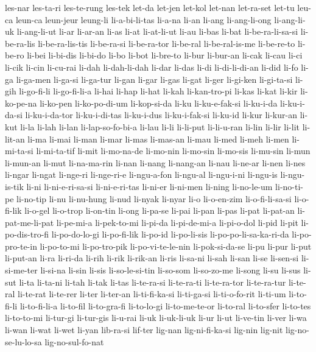 {les-nar les-ta-ri les-te-rung les-tek let-da let-jen let-kol let-nan
let-ra-set let-tu leu-ca leun-ca leun-jeur leung-li li-a-bi-li-tas li-a-na
li-an li-ang li-ang-li-ong li-ang-li-uk li-ang-li-ut li-ar li-ar-an li-as
li-at li-at-li-ut li-au li-bas li-bat li-be-ra-li-sa-si li-be-ra-lis
li-be-ra-lis-tis li-be-ra-si li-be-ra-tor li-be-ral li-be-ral-is-me
li-be-re-to li-be-ro li-bei li-bi-dis li-bi-do li-bo li-bot li-bre-to
li-bur li-bur-an li-cak li-cau li-ci li-cik li-cin li-cu-rai li-dah
li-dah-li-dah li-dar li-das li-di li-di-li-di-an li-did li-fo li-ga
li-ga-men li-ga-si li-ga-tur li-gan li-gar li-gas li-gat li-ger li-gi-ken
li-gi-ta-si li-gih li-go-fi-li li-go-fi-li-a li-hai li-hap li-hat li-kah
li-kan-tro-pi li-kas li-kat li-kir li-ko-pe-na li-ko-pen li-ko-po-di-um
li-kop-si-da li-ku li-ku-e-fak-si li-ku-i-da li-ku-i-da-si li-ku-i-da-tor
li-ku-i-di-tas li-ku-i-dus li-ku-i-fak-si li-ku-id li-kur li-kur-an li-kut
li-la li-lah li-lan li-lap-so-fo-bi-a li-lau li-li li-li-put li-li-u-ran
li-lin li-lir li-lit li-lit-an li-ma li-mai li-man li-mar li-mas li-mas-an
li-mau li-med li-meh li-men li-mi-ta-si li-mi-ta-tif li-mit li-mo-na-de
li-mo-nin li-mo-sin li-mo-sis li-mu-sin li-mun li-mun-an li-mut
li-na-ma-rin li-nan li-nang li-nang-an li-nau li-ne-ar li-nen li-nes
li-ngar li-ngat li-nge-ri li-nge-ri-e li-ngu-a-fon li-ngu-al li-ngu-i-ni
li-ngu-is li-ngu-is-tik li-ni li-ni-e-ri-sa-si li-ni-e-ri-tas li-ni-er
li-ni-men li-ning li-no-le-um li-no-ti-pe li-no-tip li-nu li-nu-hung
li-nud li-nyak li-nyar li-o li-o-en-zim li-o-fi-li-sa-si li-o-fi-lik
li-o-gel li-o-trop li-on-tin li-ong li-pa-se li-pai li-pan li-pas li-pat
li-pat-an li-pat-me-li-pat li-pe-mi-a li-pek-to-mi li-pi-da li-pi-de-mi-a
li-pi-o-dol li-pid li-pit li-po-dis-tro-fi li-po-do-lo-gi li-po-fi-lik
li-po-id li-po-li-sis li-po-po-li-sa-ka-ri-da li-po-pro-te-in li-po-to-mi
li-po-tro-pik li-po-vi-te-le-nin li-pok-si-da-se li-pu li-pur li-put
li-put-an li-ra li-ri-da li-rih li-rik li-rik-an li-ris li-sa-ni li-sah
li-san li-se li-sen-si li-si-me-ter li-si-na li-sin li-sis li-so-le-si-tin
li-so-som li-so-zo-me li-song li-su li-sus li-sut li-ta li-ta-ni li-tah
li-tak li-tas li-te-ra-si li-te-ra-ti li-te-ra-tor li-te-ra-tur li-te-ral
li-te-rat li-te-rer li-ter li-ter-an li-ti-fi-ka-si li-ti-ga-si
li-ti-o-fo-rit li-ti-um li-to-fi-li li-to-fi-li-a li-to-fil li-to-gra-fi
li-to-lo-gi li-to-me-te-or li-to-ral li-to-sfer li-to-tes li-to-to-mi
li-tur-gi li-tur-gis li-u-rai li-uk li-uk-li-uk li-ur li-ut li-ve-tin
li-ver li-wa li-wan li-wat li-wet li-yan lib-ra-si lif-ter lig-nan
lig-ni-fi-ka-si lig-nin lig-nit lig-no-se-lu-lo-sa lig-no-sul-fo-nat
}
